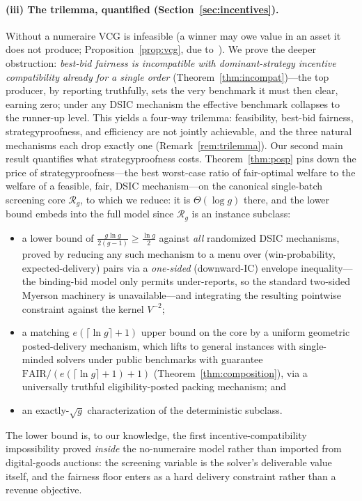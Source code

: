 \documentclass[11pt]{article}
\theoremstyle{remark}
\newcommand{\FAIR}{\mathrm{FAIR}}
\begin{document}
\paragraph{(iii) The trilemma, quantified (Section~\ref{sec:incentives}).}
Without a numeraire VCG is infeasible (a winner may owe value in an asset it
does not produce; Proposition~\ref{prop:vcg}, due
to~\cite{canidio2024}). We prove the deeper obstruction: \emph{best-bid
fairness is incompatible with dominant-strategy incentive compatibility
already for a single order} (Theorem~\ref{thm:incompat})---the top producer,
by reporting truthfully, sets the very benchmark it must then clear, earning
zero; under any DSIC mechanism the effective benchmark collapses to the
runner-up level. This yields a four-way trilemma: feasibility, best-bid
fairness, strategyproofness, and efficiency are not jointly achievable, and
the three natural mechanisms each drop exactly one
(Remark~\ref{rem:trilemma}). Our second main result quantifies what
strategyproofness costs. Theorem~\ref{thm:posp} pins down the price of
strategyproofness---the best worst-case ratio of fair-optimal welfare to the
welfare of a feasible, fair, DSIC mechanism---on the canonical single-batch
screening core $\mathcal R_g$, to which we reduce: it is $\Theta(\log g)$
there, and the lower bound embeds into the full model since $\mathcal R_g$
is an instance subclass:
\begin{itemize}[leftmargin=1.5em]
\item a lower bound of $\frac{g\ln g}{2(g-1)}\ge\frac{\ln g}{2}$ against
\emph{all} randomized DSIC mechanisms, proved by reducing any such mechanism
to a menu over (win-probability, expected-delivery) pairs via a
\emph{one-sided} (downward-IC) envelope inequality---the binding-bid model
only permits under-reports, so the standard two-sided Myerson machinery is
unavailable---and integrating the resulting pointwise constraint against
the kernel $V^{-2}$;
\item a matching $e(\lceil\ln g\rceil+1)$ upper bound on the core by a
uniform geometric posted-delivery mechanism, which lifts to general
instances with single-minded solvers under public benchmarks with
guarantee $\FAIR/(e(\lceil\ln g\rceil+1)+1)$
(Theorem~\ref{thm:composition}), via a universally truthful
eligibility-posted packing mechanism; and
\item an exactly-$\sqrt g$ characterization of the deterministic subclass.
\end{itemize}
The lower bound is, to our knowledge, the first incentive-compatibility
impossibility proved \emph{inside} the no-numeraire model rather than
imported from digital-goods auctions: the screening variable is the
solver's deliverable value itself, and the fairness floor enters as a
hard delivery constraint rather than a revenue objective.
\end{document}
